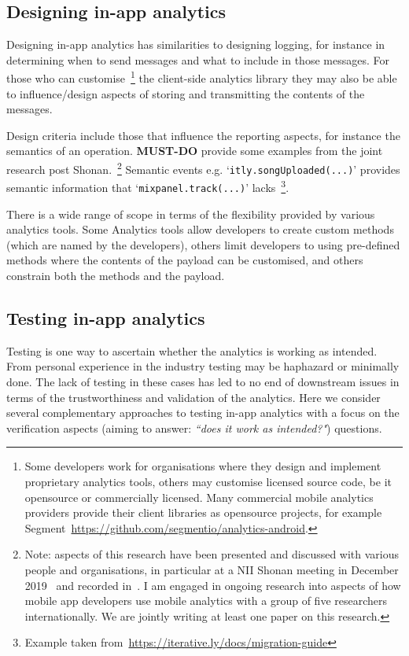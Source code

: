 \subsection{Designing in-app analytics}
Designing in-app analytics has similarities to designing logging, for instance in determining when to send messages and what to include in those messages. For those who can customise~\footnote{Some developers work for organisations where they design and implement proprietary analytics tools, others may customise licensed source code, be it opensource or commercially licensed. Many commercial mobile analytics providers provide their client libraries as opensource projects, for example Segment~\url{https://github.com/segmentio/analytics-android}.} the client-side analytics library they may also be able to influence/design aspects of storing and transmitting the contents of the messages.

Design criteria include those that influence the reporting aspects, for instance the semantics of an operation. \textbf{MUST-DO} provide some examples from the joint research post Shonan.~\footnote{Note: aspects of this research have been presented and discussed with various people and organisations, in particular at a NII Shonan meeting in December 2019~\cite{nii_shonan_workshop_152} and recorded in~\cite{nii_shonan_152_workshop_report}. I am engaged in ongoing research into aspects of how mobile app developers use mobile analytics with a group of five researchers internationally. We are jointly writing at least one paper on this research.}
%
Semantic events e.g. `\texttt{itly.songUploaded(...)}' provides semantic information that `\texttt{mixpanel.track(...)}' lacks~\footnote{Example taken from~\url{https://iterative.ly/docs/migration-guide}}.

There is a wide range of scope in terms of the flexibility provided by various analytics tools. Some Analytics tools allow developers to create custom methods (which are named by the developers), others limit developers to using pre-defined methods where the contents of the payload can be customised, and others constrain both the methods and the payload.

\subsection{Testing in-app analytics}
Testing is one way to ascertain whether the analytics is working as intended. From personal experience in the industry testing may be haphazard or minimally done. The lack of testing in these cases has led to no end of downstream issues in terms of the trustworthiness and validation of the analytics. Here we consider several complementary approaches to testing in-app analytics with a focus on the verification aspects (aiming to answer: \emph{``does it work as intended?"}) questions.

